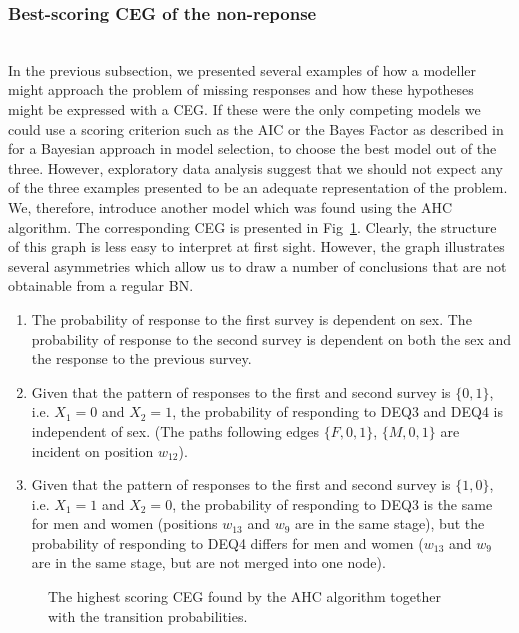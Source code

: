 \documentclass[runningheads]{llncs}
\begin{document}
\subsubsection{Best-scoring CEG of the non-reponse}\label{subsubsec:best-fit-dropout}
\hfill\\
In the previous subsection, we presented several examples of how a modeller might approach the problem of missing responses and how these hypotheses might be expressed with a CEG. If these were the only competing models we could use a scoring criterion such as the AIC or the Bayes Factor as described in \cite{smith2017cegs} for a Bayesian approach in model selection, to choose the best model out of the three. However, exploratory data analysis suggest that we should not expect any of the three examples presented to be an adequate representation of the problem. We, therefore, introduce another model which was found using the AHC algorithm. The corresponding CEG is presented in Fig~\ref{ceg:ahc-responses}. Clearly, the structure of this graph is less easy to interpret at first sight. However, the graph illustrates several asymmetries which allow us to draw a number of conclusions that are not obtainable from a regular BN.
\begin{enumerate}[topsep=0pt]
    \item The probability of response to the first survey is dependent on sex. The probability of response to the second survey is dependent on both the sex and the response to the previous survey.
    \item Given that the pattern of responses to the first and second survey is $\{0, 1\}$, i.e. $X_1 = 0$ and $X_2 = 1$, the probability of responding to DEQ3 and DEQ4 is independent of sex. (The paths following edges $\{F, 0, 1\}$, $\{M, 0, 1\}$ are incident on position $w_{12}$).
    \item Given that the pattern of responses to the first and second survey is $\{1, 0\}$, i.e. $X_1 = 1$ and $X_2 = 0$, the probability of responding to DEQ3 is the same for men and women (positions $w_{13}$ and $w_{9}$ are in the same stage), but the probability of responding to DEQ4 differs for men and women ($w_{13}$ and $w_{9}$ are in the same stage, but are not merged into one node).
\end{enumerate}
\begin{figure}
\centering

\vspace{1ex}
\caption{The highest scoring CEG found by the AHC algorithm together with the transition probabilities.}
\label{ceg:ahc-responses}
\end{figure}
\end{document}
